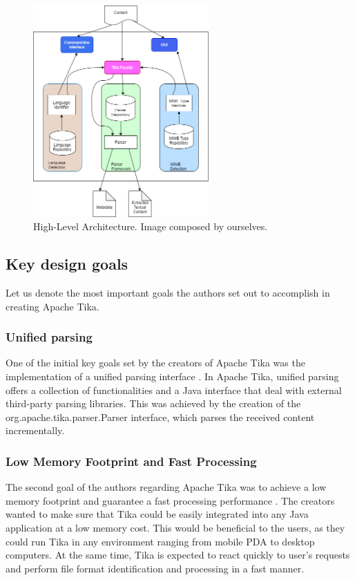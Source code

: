 \documentclass{article}
\begin{document}
\begin{figure}[H]
    \centering
    \includegraphics[width=0.6\textwidth]{report/images/tika_architecture.png}
    \caption{High-Level Architecture. Image composed by ourselves.}
    \label{fig:architectur}
\end{figure}

\subsection{Key design goals}
Let us denote the most important goals the authors set out to accomplish in creating Apache Tika.
\subsubsection{Unified parsing}
One of the initial key goals set by the creators of Apache Tika was the implementation of a unified parsing interface \citep{tika_in_action}.  In Apache Tika, unified parsing offers a collection of functionalities and a Java interface that deal with external third-party parsing libraries. This was achieved by the creation of the org.apache.tika.parser.Parser interface, which parses the received content incrementally.

\subsubsection{Low Memory Footprint and Fast Processing}
The second goal of the authors regarding Apache Tika was to achieve a low memory footprint and guarantee a fast processing performance \citep{tika_in_action}. The creators wanted to make sure that Tika could be easily integrated into any Java application at a low memory cost. This would be beneficial to the users, as they could run Tika in any environment ranging from mobile PDA to desktop computers. At the same time, Tika is expected to react quickly to user’s requests and perform file format identification and processing in a fast manner.
\end{document}
